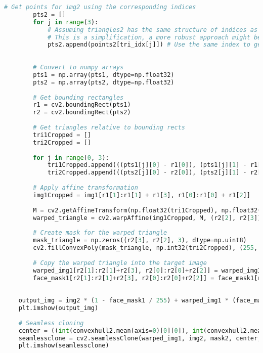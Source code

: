 \begin{lstlisting}[caption={student.py}, label={lst:code-example}, captionpos=t, language=python]
        # Get points for img2 using the corresponding indices
        pts2 = []
        for j in range(3):
            # Assuming triangles2 has the same structure of indices as triangles1
            # This is a simplification, a more robust approach might be needed for complex cases
            pts2.append(points2[tri_idx[j]]) # Use the same index to get the corresponding point from landmarks2
    
    
        # Convert to numpy arrays
        pts1 = np.array(pts1, dtype=np.float32)
        pts2 = np.array(pts2, dtype=np.float32)
    
        # Get bounding rectangles
        r1 = cv2.boundingRect(pts1)
        r2 = cv2.boundingRect(pts2)
    
        # Get triangles relative to bounding rects
        tri1Cropped = []
        tri2Cropped = []
    
        for j in range(0, 3):
            tri1Cropped.append(((pts1[j][0] - r1[0]), (pts1[j][1] - r1[1])))
            tri2Cropped.append(((pts2[j][0] - r2[0]), (pts2[j][1] - r2[1])))
    
        # Apply affine transformation
        img1Cropped = img1[r1[1]:r1[1] + r1[3], r1[0]:r1[0] + r1[2]]
    
        M = cv2.getAffineTransform(np.float32(tri1Cropped), np.float32(tri2Cropped))
        warped_triangle = cv2.warpAffine(img1Cropped, M, (r2[2], r2[3]), None, flags=cv2.INTER_LINEAR, borderMode=cv2.BORDER_REFLECT_101)
    
        # Create mask for the warped triangle
        mask_triangle = np.zeros((r2[3], r2[2], 3), dtype=np.uint8)
        cv2.fillConvexPoly(mask_triangle, np.int32(tri2Cropped), (255, 255, 255))
    
        # Copy the warped triangle into the target image
        warped_img1[r2[1]:r2[1]+r2[3], r2[0]:r2[0]+r2[2]] = warped_img1[r2[1]:r2[1]+r2[3], r2[0]:r2[0]+r2[2]] * (1 - mask_triangle / 255) + warped_triangle * (mask_triangle / 255)
        face_mask1[r2[1]:r2[1]+r2[3], r2[0]:r2[0]+r2[2]] = face_mask1[r2[1]:r2[1]+r2[3], r2[0]:r2[0]+r2[2]] * (1 - mask_triangle / 255) + mask_triangle * (mask_triangle / 255)
    
    
    output_img = img2 * (1 - face_mask1 / 255) + warped_img1 * (face_mask1 / 255)
    plt.imshow(output_img)
    
    # Seamless cloning
    center = ((int(convexhull2.mean(axis=0)[0][0]), int(convexhull2.mean(axis=0)[0][1])))
    seamlessclone = cv2.seamlessClone(warped_img1, img2, mask2, center, cv2.NORMAL_CLONE)
    plt.imshow(seamlessclone)
    
\end{lstlisting}